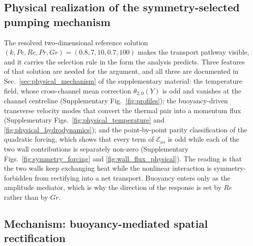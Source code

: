 \documentclass[12pt,a4paper]{article}
\newcommand{\Rey}{\mathit{Re}}
\newcommand{\Pe}{\mathit{Pe}}
\newcommand{\Grr}{\mathit{Gr}}
\renewcommand{\Pr}{\mathit{Pr}}
\begin{document}
\subsection{Physical realization of the symmetry-selected pumping mechanism}
\label{sec:physical_summary}

The resolved two-dimensional reference solution
$(k,\Pe,\Rey,\Pr,\Grr)=(0.8,7,10,0.7,100)$ makes the transport pathway visible, and it
carries the selection rule in the form the analysis predicts. Three features of that
solution are needed for the argument, and all three are documented in
Sec.~\ref{sec:physical_mechanism} of the supplementary material: the temperature field, whose
cross-channel mean correction $\theta_{2,0}(Y)$ is odd and vanishes at the channel
centreline (Supplementary Fig.~\ref{fig:profiles}); the buoyancy-driven transverse
velocity modes that convert the thermal pair into a momentum flux
(Supplementary Figs.~\ref{fig:physical_temperature} and
\ref{fig:physical_hydrodynamics}); and the point-by-point parity classification of the
quadratic forcing, which shows that every term of $\mathcal E_{as}$ is odd while each of
the two wall contributions is separately non-zero
(Supplementary Figs.~\ref{fig:symmetry_forcing} and \ref{fig:wall_flux_physical}). The
reading is that the two walls keep exchanging heat while the nonlinear interaction is
symmetry-forbidden from rectifying into a net transport. Buoyancy enters only as the
amplitude mediator, which is
why the direction of the response is set by $\Rey$ rather than by $\Grr$.

\subsection{Mechanism: buoyancy-mediated spatial rectification}
\label{sec:spatial_rectification}
\end{document}
